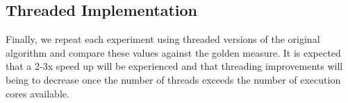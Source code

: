 \subsection{Threaded Implementation}
Finally, we repeat each experiment using threaded versions of the original algorithm and compare these values against the golden measure. It is expected that a 2-3x speed up will be experienced and that threading improvements will being to decrease once the number of threads exceeds the number of execution cores available.